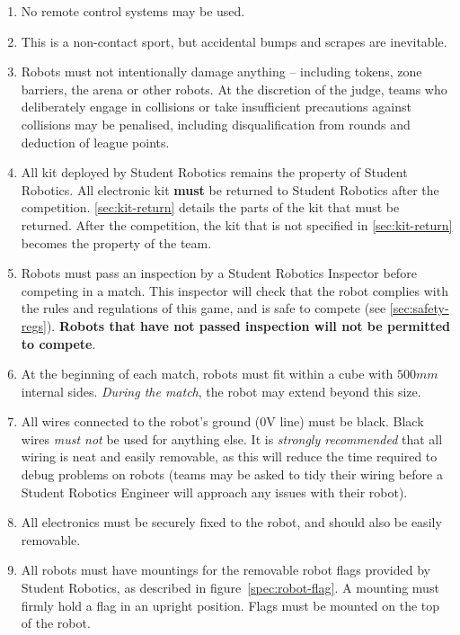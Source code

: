 \begin{enumerate}
\item No remote control systems may be used.
\item This is a non-contact sport, but accidental bumps and scrapes are inevitable.
\item Robots must not intentionally damage anything -- including tokens, zone barriers, the arena or other robots.
      At the discretion of the judge, teams who deliberately engage in collisions or take insufficient precautions against collisions may be penalised, including disqualification from rounds and deduction of league points.
\item All kit deployed by Student Robotics remains the property of Student Robotics.
      All electronic kit \textbf{must} be returned to Student Robotics after the competition.
      \autoref{sec:kit-return} details the parts of the kit that must be returned.
      After the competition, the kit that is not specified in \autoref{sec:kit-return} becomes the property of the team.


\item Robots must pass an inspection by a Student Robotics Inspector before competing in a match.
      This inspector will check that the robot complies with the rules and regulations of this game, and is safe to compete (see \autoref{sec:safety-regs}).
      \textbf{Robots that have not passed inspection will not be permitted to compete}.

\item At the beginning of each match, robots must fit within a cube with $500mm$ internal sides.
      \textit{During the match}, the robot may extend beyond this size.

\item All wires connected to the robot's ground (0V line) must be black.
      Black wires \emph{must not} be used for anything else.
      It is \emph{strongly recommended} that all wiring is neat and easily removable, as this will reduce the time required to debug problems on robots
       (teams may be asked to tidy their wiring before a Student Robotics Engineer will approach any issues with their robot).

\item All electronics must be securely fixed to the robot, and should also be easily removable.

\item All robots must have mountings for the removable robot flags
      provided by Student Robotics, as described in figure~\ref{spec:robot-flag}. A mounting
      must firmly hold a flag in an upright position. Flags must be mounted on the top of the robot.


\end{enumerate}
